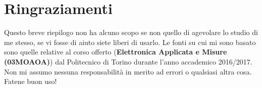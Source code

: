 \documentclass[12pt]{article}
\begin{document}
\section{Ringraziamenti} Questo breve riepilogo non ha alcuno scopo se non quello di agevolare lo studio di me stesso, se vi fosse di aiuto siete liberi di usarlo. Le fonti su cui mi sono basato sono quelle relative al corso offerto (\textbf{Elettronica Applicata e Misure (03MOAOA)}) dal Politecnico di Torino durante l'anno accademico 2016/2017.\\
Non mi assumo nessuna responsabilità in merito ad errori o qualsiasi altra cosa. Fatene buon uso!




\end{document}
